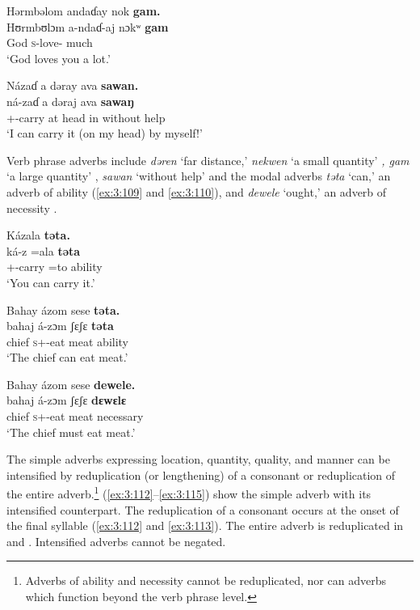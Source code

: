 \ea \label{ex:3:107}
Hərmbəlom  andaɗay  nok  \textbf{gam.}\\
\gll  Hʊrmbʊlɔm  a-ndaɗ-aj  nɔkʷ  \textbf{gam}\\
      God    \textsc{s}-love-{\CL}  {\twoS}  much\\
\glt  ‘God loves you a lot.’
\z

\ea \label{ex:3:108}
Názaɗ  a  dəray  ava  \textbf{sawan.}\\
\gll  ná-zaɗ    a  dəraj  ava    \textbf{sawaŋ}\\
      {\oneS}+{\IFV}-carry    at  head  in    {without help}\\
\glt  ‘I can carry it (on my head) by myself!’
\z

Verb phrase adverbs include \textit{dəren} ‘far distance,’ \textit{nekwen} ‘a small quantity’ \textit{, gam }‘a large quantity’ , \textit{sawan} ‘without help’  and the modal adverbs \textit{təta} ‘can,’ an adverb of ability (\ref{ex:3:109} and \ref{ex:3:110}), and \textit{dewele } ‘ought,’ an adverb of necessity . 

\ea \label{ex:3:109}
Kázala  \textbf{təta.}\\
\gll  ká-z      =ala    \textbf{təta}\\
      {\twoS}+{\IFV}-carry    =to    ability\\
\glt  ‘You can carry it.’
\z

\ea \label{ex:3:110}
Bahay  ázom  sese  \textbf{təta.}\\
\gll  bahaj  á-zɔm    ʃɛʃɛ  \textbf{təta}\\
      chief  \textsc{s}+{\IFV}-eat  meat  ability\\
\glt  ‘The chief can eat meat.’
\z

\ea \label{ex:3:111}
Bahay  ázom  sese  \textbf{dewele.}\\
\gll  bahaj   á-zɔm    ʃɛʃɛ  \textbf{dɛwɛlɛ}\\
      chief  \textsc{s}+{\IFV}-eat  meat  necessary\\
\glt  ‘The chief must eat meat.’
\z

The simple adverbs expressing location, quantity, quality, and manner can be intensified by reduplication (or lengthening) of a consonant or reduplication of the entire adverb.\footnote{Adverbs of ability and necessity cannot be reduplicated, nor can adverbs which function beyond the verb phrase level. }  (\ref{ex:3:112}--\ref{ex:3:115}) show the simple adverb with its intensified counterpart. The reduplication of a consonant occurs at the onset of the final syllable (\ref{ex:3:112} and \ref{ex:3:113}). The entire adverb is reduplicated in  and . Intensified adverbs cannot be negated. 


